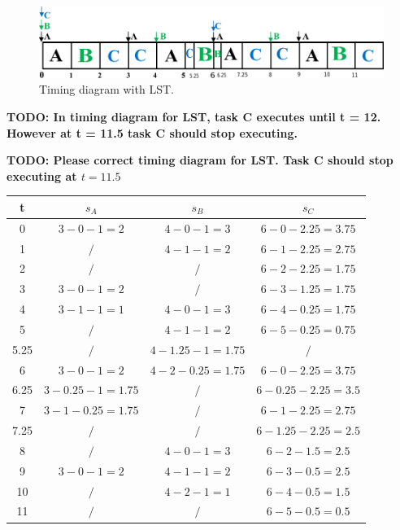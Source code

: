 \documentclass[10pt,a4paper]{article}
\begin{document}
\begin{figure}[h]
\includegraphics[width=\linewidth]{1b-lst.pdf}
\caption{Timing diagram with LST.} 
\label{fig:1blst}
\end{figure}

\textbf{TODO: In timing diagram for LST, task C executes until t = 12. However at t = 11.5 task C should stop executing.}

\textbf{TODO: Please correct timing diagram for LST. Task C should stop executing at $t=11.5$}

\begin{center}
\caption {LST Scheduling table} \label{tab:lst} 
 \begin{tabular}
 {||c c c c||} 
 \hline
 t & $s_A$ & $s_B$ & $s_C$ \\ [0.5ex] 
 \hline\hline
 0 & $3-0-1=2$ & $4-0-1=3$ & $6-0-2.25=3.75$ \\ 
 \hline
 1 & $/$ & $4-1-1=2$ & $6-1-2.25=2.75$ \\
 \hline
 2 & $/$ & $/$ & $6-2-2.25=1.75$ \\
 \hline
 3 & $3-0-1=2$ & $/$ & $6-3-1.25=1.75$ \\
 \hline
 4 & $3-1-1=1$ & $4-0-1=3$ & $6-4-0.25=1.75$ \\
 \hline
 5 & $/$ & $4-1-1=2$ & $6-5-0.25=0.75$ \\
 \hline
 5.25 & $/$ & $4-1.25-1=1.75$ & $/$ \\
 \hline
 6 & $3-0-1=2$ & $4-2-0.25=1.75$ & $6-0-2.25=3.75$ \\
 \hline
 6.25 & $3-0.25-1=1.75$ & $/$ & $6-0.25-2.25=3.5$ \\
 \hline
 7 & $3-1-0.25=1.75$ & $/$ & $6-1-2.25=2.75$ \\
 \hline
 7.25 & $/$ & $/$ & $6-1.25-2.25=2.5$ \\
 \hline
 8 & $/$ & $4-0-1=3$ & $6-2-1.5=2.5$\\ \hline
 9 & $3-0-1=2$ & $4-1-1=2$ & $6-3-0.5=2.5$\\
 \hline
 10 & $/$ & $4-2-1=1$ & $6-4-0.5=1.5$\\
 \hline
 11 & $/$ & $/$ & $6-5-0.5=0.5$ \\
 [1ex] 
 \hline
\end{tabular}
\end{center}
\end{document}

